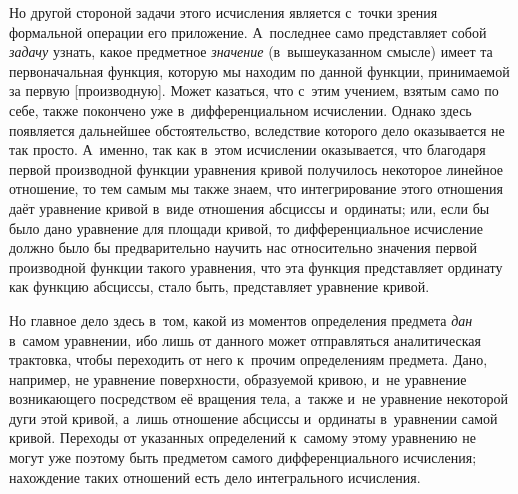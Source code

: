 Но другой стороной задачи этого исчисления является с~точки зрения формальной
операции его приложение. А~последнее само представляет собой {\em задачу}
узнать, какое предметное {\em значение} (в~вышеуказанном смысле) имеет та
первоначальная функция, которую мы находим по данной функции, принимаемой за
первую [производную]. Может казаться, что с~этим учением, взятым само по себе,
также покончено уже в~дифференциальном исчислении. Однако здесь появляется
дальнейшее обстоятельство, вследствие которого дело оказывается не так просто.
А~именно, так как в~этом исчислении оказывается, что благодаря первой
производной функции уравнения кривой получилось некоторое линейное отношение,
то тем самым мы также знаем, что интегрирование этого отношения даёт уравнение
кривой в~виде отношения абсциссы и~ординаты; или, если бы было дано уравнение
для площади кривой, то дифференциальное исчисление должно было бы
предварительно научить нас относительно значения первой производной функции
такого уравнения, что эта функция представляет ординату как функцию абсциссы,
стало быть, представляет уравнение кривой.

Но главное дело здесь в~том, какой из моментов определения предмета {\em дан}
в~самом уравнении, ибо лишь от данного может отправляться аналитическая
трактовка, чтобы переходить от него к~прочим определениям предмета. Дано,
например, не уравнение поверхности, образуемой кривою, и~не уравнение
возникающего посредством её вращения тела, а~также и~не уравнение некоторой
дуги этой кривой, а~лишь отношение абсциссы и~ординаты в~уравнении самой
кривой. Переходы от указанных определений к~самому этому уравнению не могут уже
поэтому быть предметом самого дифференциального исчисления; нахождение таких
отношений есть дело интегрального исчисления.

